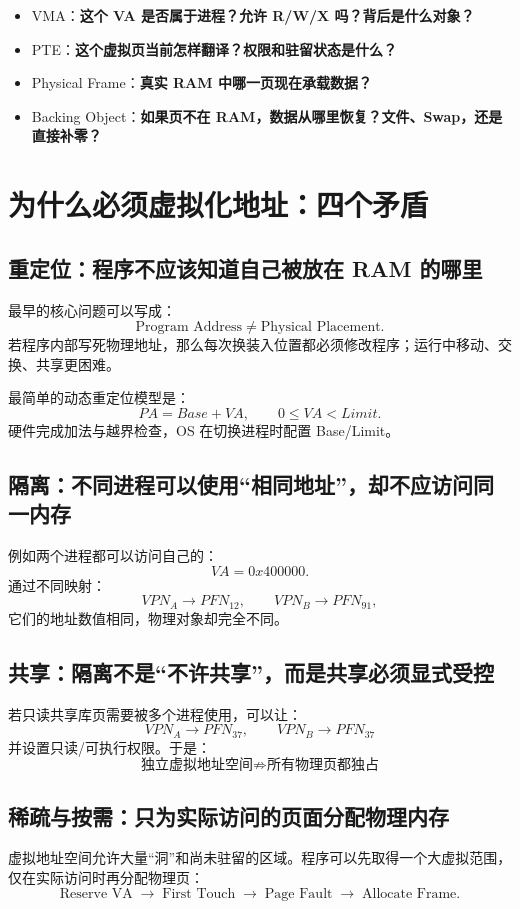 \documentclass[11pt,a4paper]{ctexart}
\newcommand{\kw}[1]{\textbf{#1}}
\newcommand{\arr}{\;\longrightarrow\;}
\begin{document}
\begin{statebox}[每层回答不同问题]
\begin{itemize}
  \item VMA：\kw{这个 VA 是否属于进程？允许 R/W/X 吗？背后是什么对象？}
  \item PTE：\kw{这个虚拟页当前怎样翻译？权限和驻留状态是什么？}
  \item Physical Frame：\kw{真实 RAM 中哪一页现在承载数据？}
  \item Backing Object：\kw{如果页不在 RAM，数据从哪里恢复？文件、Swap，还是直接补零？}
\end{itemize}
\end{statebox}

\section{为什么必须虚拟化地址：四个矛盾}

\subsection{重定位：程序不应该知道自己被放在 RAM 的哪里}
最早的核心问题可以写成：
\[
\text{Program Address} \neq \text{Physical Placement}.
\]
若程序内部写死物理地址，那么每次换装入位置都必须修改程序；运行中移动、交换、共享更困难。

最简单的动态重定位模型是：
\[
PA = Base + VA, \qquad 0\le VA<Limit.
\]
硬件完成加法与越界检查，OS 在切换进程时配置 Base/Limit。

\subsection{隔离：不同进程可以使用“相同地址”，却不应访问同一内存}
例如两个进程都可以访问自己的：
\[
VA=0x400000.
\]
通过不同映射：
\[
VPN_A\to PFN_{12},\qquad VPN_B\to PFN_{91},
\]
它们的地址数值相同，物理对象却完全不同。

\subsection{共享：隔离不是“不许共享”，而是共享必须显式受控}
若只读共享库页需要被多个进程使用，可以让：
\[
VPN_A\to PFN_{37},\qquad VPN_B\to PFN_{37}
\]
并设置只读/可执行权限。于是：
\[
\boxed{\text{独立虚拟地址空间} \not\Rightarrow \text{所有物理页都独占}}
\]

\subsection{稀疏与按需：只为实际访问的页面分配物理内存}
虚拟地址空间允许大量“洞”和尚未驻留的区域。程序可以先取得一个大虚拟范围，仅在实际访问时再分配物理页：
\[
\text{Reserve VA} \arr \text{First Touch} \arr \text{Page Fault} \arr \text{Allocate Frame}.
\]
\end{document}

